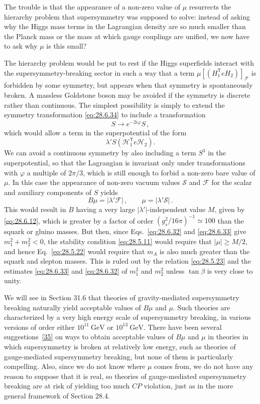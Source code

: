 The trouble is that the appearance of a non-zero value of \(\mu\)
resurrects the hierarchy problem that supersymmetry was supposed to solve:
instead of asking why the Higgs mass terms in the Lagrangian density are
so much smaller than the Planck mass or the mass at which gauge couplings
are unified, we now have to ask why \(\mu\) is this small?

The hierarchy problem would be put to rest if the Higgs superfields
interact with the supersymmetry-breaking sector in such a way that a term
\(\mu[(H_1^{\mathsf T}eH_2)]_{\mathcal{F}}\) is forbidden by some
symmetry, but appears when that symmetry is spontaneously broken. A
massless Goldstone boson may be avoided if the symmetry is discrete rather
than continuous. The simplest possibility is simply to extend the
symmetry transformation \eqref{eq:28.6.34} to include a transformation
\[
  S\longrightarrow e^{-2i\varphi}S\,,
\]
which would allow a term in the superpotential of the form
\[
  \lambda'S(\mathcal{H}_1^{\mathsf T}e\mathcal{H}_2).
\]
We can avoid a continuous symmetry by also including a term \(S^3\) in
the superpotential, so that the Lagrangian is invariant only under
transformations with \(\varphi\) a multiple of \(2\pi/3\), which is still
enough to forbid a non-zero bare value of \(\mu\). In this case the
appearance of non-zero vacuum values \(\mathcal{S}\) and \(\mathcal{F}\)
for the scalar and auxiliary components of \(S\) yields
\[
  B\mu=\lvert\lambda'\mathcal{F}\rvert\,,
  \qquad
  \mu=\lvert\lambda'\mathcal{S}\rvert\,.
\]
This would result in \(B\) having a very large
\(\lvert\lambda'\rvert\)-independent value \(M\), given by
\eqref{eq:28.6.12}, which is greater by a factor of order
\((g_s^2/16\pi)^{-1}\simeq100\) than the squark or gluino masses. But
then, since Eqs.~\eqref{eq:28.6.32} and \eqref{eq:28.6.33} give
\(m_1^2+m_2^2<0\), the stability condition \eqref{eq:28.5.11} would
require that \(\lvert\mu\rvert\geq M/2\), and hence
Eq.~\eqref{eq:28.5.22} would require that \(m_A\) is also much greater
than the squark and slepton masses. This is ruled out by the relation
\eqref{eq:28.5.23} and the estimates \eqref{eq:28.6.33} and
\eqref{eq:28.6.32} of \(m_1^2\) and \(m_2^2\) unless \(\tan\beta\) is
very close to unity.

We will see in Section 31.6 that theories of gravity-mediated
supersymmetry breaking naturally yield acceptable values of \(B\mu\) and
\(\mu\). Such theories are characterized by a very high energy scale of
supersymmetry breaking, in various versions of order either
\(10^{11}\ \mathrm{GeV}\) or \(10^{13}\ \mathrm{GeV}\). There have been
several suggestions~\hyperref[ch28-ref-35]{[35]} on ways to obtain
acceptable values of \(B\mu\) and \(\mu\) in theories in which
supersymmetry is broken at relatively low energy, such as theories of
gauge-mediated supersymmetry breaking, but none of them is particularly
compelling. Also, since we do not know where \(\mu\) comes from, we do not
have any reason to suppose that it is real, so theories of gauge-mediated
supersymmetry breaking are at risk of yielding too much \(CP\) violation,
just as in the more general framework of Section 28.4.

